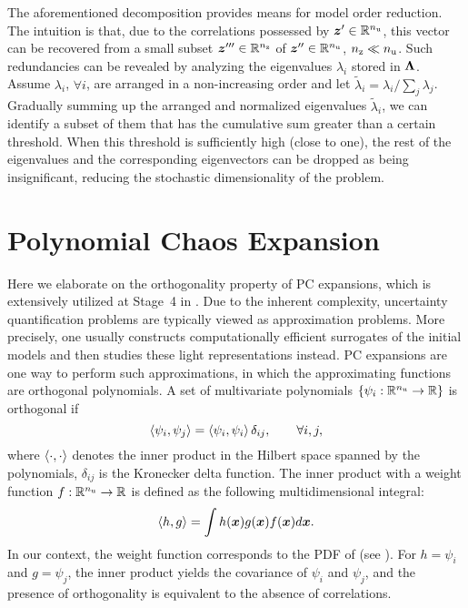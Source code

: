 The aforementioned decomposition provides means for model order reduction. The
intuition is that, due to the correlations possessed by $\boldsymbol{z}' \in \mathbb{R}^{n_\mathrm{u}}$,
this vector can be recovered from a small subset $\boldsymbol{z}''' \in \mathbb{R}^{n_\mathrm{z}}$ of
$\boldsymbol{z}'' \in \mathbb{R}^{n_\mathrm{u}}$, ${n_\mathrm{z}} \ll {n_\mathrm{u}}$. Such redundancies can be revealed by
analyzing the eigenvalues $\lambda_i$ stored in $\mathbf{\Lambda}$. Assume
$\lambda_i$, $\forall i$, are arranged in a non-increasing order and let
$\tilde{\lambda}_i = \lambda_i / \sum_j \lambda_j$. Gradually summing up the
arranged and normalized eigenvalues $\tilde{\lambda}_i$, we can identify a
subset of them that has the cumulative sum greater than a certain threshold.
When this threshold is sufficiently high (close to one), the rest of the
eigenvalues and the corresponding eigenvectors can be dropped as being
insignificant, reducing the stochastic dimensionality of the problem.

\section{Polynomial Chaos Expansion}

Here we elaborate on the orthogonality property \cite{xiu2010} of PC expansions,
which is extensively utilized at Stage~4 in . Due to the
inherent complexity, uncertainty quantification problems are typically viewed as
approximation problems. More precisely, one usually constructs computationally
efficient surrogates of the initial models and then studies these light
representations instead. PC expansions \cite{xiu2010} are one way to perform
such approximations, in which the approximating functions are orthogonal
polynomials. A set of multivariate polynomials $\{ \psi_i: \mathbb{R}^{n_\mathrm{u}} \to
\mathbb{R} \}$ is orthogonal if
\begin{equation} \elab{orthogonality}
  \innerproduct{\psi_i}{\psi_j} = \innerproduct{\psi_i}{\psi_i} \delta_{ij}, \qquad \forall i, j,
\end{equation}
where $\left\langle \cdot, \cdot \right\rangle$ denotes the inner product in the Hilbert
space spanned by the polynomials, $\delta_{ij}$ is the Kronecker delta function.
The inner product with a weight function $f: \mathbb{R}^{n_\mathrm{u}} \to \mathbb{R}$ is defined as
the following multidimensional integral:
\begin{equation} \elab{inner-product}
  \innerproduct{h}{g} = \int h(\v{x}) g(\v{x}) f(\v{x}) d\v{x}.
\end{equation}
In our context, the weight function corresponds to the PDF of \vz (see
). For $h = \psi_i$ and $g = \psi_j$, the inner
product yields the covariance of $\psi_i$ and $\psi_j$, and the presence of
orthogonality is equivalent to the absence of correlations.

